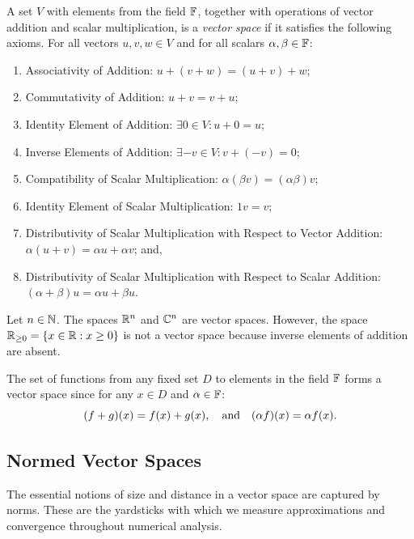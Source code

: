 \begin{definition}\label{definition:vectorspace}
A set $V$ with elements from the field $\mathbb{F}$, together with operations of vector addition and scalar multiplication, is a {\em vector space} if it satisfies the following axioms. For all vectors $u,v,w\in V$ and for all scalars $\alpha,\beta\in\mathbb{F}$:
\begin{enumerate}
\item Associativity of Addition: $u+(v+w) = (u+v)+w$;
\item Commutativity of Addition: $u+v = v+u$;
\item Identity Element of Addition: $\exists 0\in V: u+0 = u$;
\item Inverse Elements of Addition: $\exists -v\in V: v+(-v) = 0$;
\item Compatibility of Scalar Multiplication: $\alpha(\beta v) = (\alpha\beta)v$;
\item Identity Element of Scalar Multiplication: $1v = v$;
\item Distributivity of Scalar Multiplication with Respect to Vector Addition: $\alpha(u+v) = \alpha u + \alpha v$; and,
\item Distributivity of Scalar Multiplication with Respect to Scalar Addition: $(\alpha + \beta)u = \alpha u + \beta u$.
\end{enumerate}
\end{definition}

\begin{example}
Let $n\in\mathbb{N}$. The spaces $\mathbb{R}^n$ and $\mathbb{C}^n$ are vector spaces. However, the space $\mathbb{R}_{\ge0} = \{x\in\mathbb{R}:x\ge0\}$ is not a vector space because inverse elements of addition are absent.
\end{example}

\begin{example}
The set of functions from any fixed set $D$ to elements in the field $\mathbb{F}$ forms a vector space since for any $x\in D$ and $\alpha\in\mathbb{F}$:
\[
(f+g)(x) = f(x) + g(x),\quad{\rm and}\quad (\alpha f)(x) = \alpha f(x).
\]
\end{example}

\subsection{Normed Vector Spaces}

The essential notions of size and distance in a vector space are captured by norms. These are the yardsticks with which we measure approximations and convergence throughout numerical analysis.

